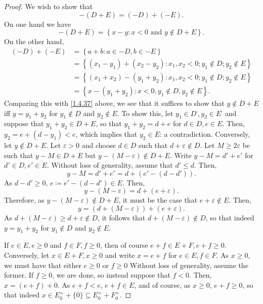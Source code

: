 \begin{thm}
\begin{proof}
\label{stp1.4.18.9}
We wish to show that
\begin{equation}\label{1.4.37}
-(D+E)=(-D)+(-E).
\end{equation}
On one hand we have
\begin{equation}
-(D+E)=\left\{ x-y:x<0\text{ and }y\notin D+E\right\} .
\end{equation}
On the other hand,
\begin{equation}
\begin{split}
(-D)+(-E) & =\left\{ a+b:a\in -D,b\in -E\right\} \\
& =\left\{ (x_1-y_1)+(x_2-y_2):x_1,x_2<0;y_1\notin D;y_2\notin E\right\} \\
& =\left\{ (x_1+x_2)-(y_1+y_2):x_1,x_2<0;y_1\notin D;y_2\notin E\right\} \\
& =\left\{ x-(y_1+y_2):x<0,y_1\notin D,y_2\notin E\right\} .
\end{split}
\end{equation}
Comparing this with \eqref{1.4.37} above, we see that it suffices to show that $y\notin D+E$ iff $y=y_1+y_2$ for $y_1\notin D$ and $y_2\notin E$.  To show this, let $y_1\in D^{\comp},y_2\in E^{\comp}$ and suppose that $y_1+y_2\in D+E$, so that $y_1+y_2=d+e$ for $d\in D,e\in E$.  Then, $y_2=e+(d-y_1)<e$, which implies that $y_2\in E$:  a contradiction.  Conversely, let $y\notin D+E$.  Let $\varepsilon >0$ and choose $d\in D$ such that $d+\varepsilon \notin D$.  Let $M\geq 2\varepsilon$ be such that $y-M\in D+E$ but $y-(M-\varepsilon )\notin D+E$.  Write $y-M=d'+e'$ for $d'\in D,e'\in E$.  Without loss of generality, assume that $d'\leq d$.  Then,
\begin{equation}
y-M=d'+e'=d+\left( e'-(d-d')\right) .
\end{equation}
As $d-d'\geq 0$, $e\coloneqq e'-(d-d')\in E$.  Then,
\begin{equation}
y-(M-\varepsilon )=d+(e+\varepsilon ).
\end{equation}
Therefore, as $y-(M-\varepsilon )\notin D+E$, it must be the case that $e+\varepsilon \notin E$.  Then,
\begin{equation}
y=\left( d+(M-\varepsilon )\right) +(e+\varepsilon ).
\end{equation}
As $d+(M-\varepsilon )\geq d+\varepsilon \notin D$, it follows that $d+(M-\varepsilon )\notin D$, so that indeed $y=y_1+y_2$ for $y_1\notin D$ and $y_2\notin E$.

If $e\in E,e\geq 0$ and $f\in F,f\geq 0$, then of course $e+f\in E+F,e+f\geq 0$.  Conversely, let $x\in E+F,x\geq 0$ and write $x=e+f$ for $e\in E,f\in F$.  As $x\geq 0$, we must have that either $e\geq 0$ or $f\geq 0$  Without loss of generality, assume the former.  If $f\geq 0$, we are done, so instead suppose that $f<0$.  Then, $x=(e+f)+0$.  As $e+f<e$, $e+f\in E$, and of course, as $x\geq 0$, $e+f\geq 0$, so that indeed $x\in E_0^++\{ 0\} \subseteq E_0^++F_0^+$.


\end{proof}
\end{thm}
